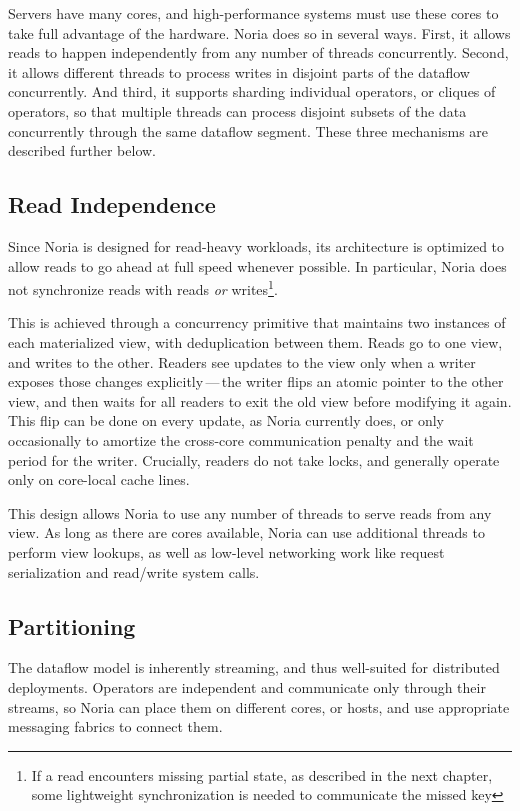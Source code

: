 Servers have many cores, and high-performance systems must use these cores to
take full advantage of the hardware. Noria does so in several ways. First, it
allows reads to happen independently from any number of threads concurrently.
Second, it allows different threads to process writes in disjoint parts of the
dataflow concurrently. And third, it supports sharding individual operators, or
cliques of operators, so that multiple threads can process disjoint subsets of
the data concurrently through the same dataflow segment. These three mechanisms
are described further below.

\subsection{Read Independence}

Since Noria is designed for read-heavy workloads, its architecture is optimized
to allow reads to go ahead at full speed whenever possible. In particular, Noria
does not synchronize reads with reads \emph{or} writes\footnote{If a read
encounters missing partial state, as described in the next chapter, some
lightweight synchronization is needed to communicate the missed key}.

This is achieved through a concurrency primitive that maintains two instances of
each materialized view, with deduplication between them. Reads go to one view,
and writes to the other. Readers see updates to the view only when a writer
exposes those changes explicitly\,---\,the writer flips an atomic pointer to the
other view, and then waits for all readers to exit the old view before modifying
it again. This flip can be done on every update, as Noria currently does, or
only occasionally to amortize the cross-core communication penalty and the wait
period for the writer. Crucially, readers do not take locks, and generally
operate only on core-local cache lines.

This design allows Noria to use any number of threads to serve reads from any
view. As long as there are cores available, Noria can use additional threads to
perform view lookups, as well as low-level networking work like request
serialization and read/write system calls.

\subsection{Partitioning}
\label{s:noria:partitioning}

The dataflow model is inherently streaming, and thus well-suited for distributed
deployments. Operators are independent and communicate only through their
streams, so Noria can place them on different cores, or hosts, and use
appropriate messaging fabrics to connect them.

